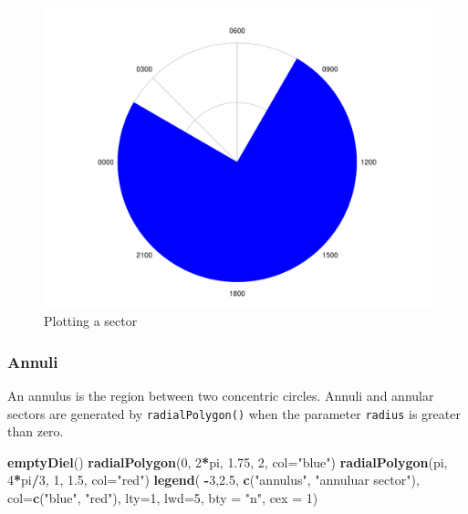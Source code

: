 \documentclass[
]{book}
\newenvironment{Shaded}{\begin{snugshade}}{\end{snugshade}}
\newcommand{\AttributeTok}[1]{\textcolor[rgb]{0.13,0.29,0.53}{#1}}
\newcommand{\DecValTok}[1]{\textcolor[rgb]{0.00,0.00,0.81}{#1}}
\newcommand{\FloatTok}[1]{\textcolor[rgb]{0.00,0.00,0.81}{#1}}
\newcommand{\FunctionTok}[1]{\textcolor[rgb]{0.13,0.29,0.53}{\textbf{#1}}}
\newcommand{\NormalTok}[1]{#1}
\newcommand{\SpecialCharTok}[1]{\textcolor[rgb]{0.81,0.36,0.00}{\textbf{#1}}}
\newcommand{\StringTok}[1]{\textcolor[rgb]{0.31,0.60,0.02}{#1}}
\begin{document}
\begin{figure}

{\centering \includegraphics[width=0.9\linewidth]{_main_files/figure-latex/radialPolygon-sector2-1} 

}

\caption{Plotting a sector}\label{fig:radialPolygon-sector2}
\end{figure}

\hypertarget{annuli}{%
\subsubsection{Annuli}\label{annuli}}

An annulus is the region between two concentric circles. Annuli and annular sectors are generated by \texttt{radialPolygon()} when the parameter \texttt{radius} is greater than zero.

\begin{Shaded}
\begin{Highlighting}[]
\FunctionTok{emptyDiel}\NormalTok{()}
\FunctionTok{radialPolygon}\NormalTok{(}\DecValTok{0}\NormalTok{, }\DecValTok{2}\SpecialCharTok{*}\NormalTok{pi, }\FloatTok{1.75}\NormalTok{, }\DecValTok{2}\NormalTok{, }\AttributeTok{col=}\StringTok{"blue"}\NormalTok{)}
\FunctionTok{radialPolygon}\NormalTok{(pi, }\DecValTok{4}\SpecialCharTok{*}\NormalTok{pi}\SpecialCharTok{/}\DecValTok{3}\NormalTok{, }\DecValTok{1}\NormalTok{, }\FloatTok{1.5}\NormalTok{, }\AttributeTok{col=}\StringTok{"red"}\NormalTok{)}
\FunctionTok{legend}\NormalTok{(}
  \SpecialCharTok{{-}}\DecValTok{3}\NormalTok{,}\FloatTok{2.5}\NormalTok{,}
  \FunctionTok{c}\NormalTok{(}\StringTok{"annulus"}\NormalTok{, }\StringTok{"annuluar sector"}\NormalTok{),}
  \AttributeTok{col=}\FunctionTok{c}\NormalTok{(}\StringTok{"blue"}\NormalTok{, }\StringTok{"red"}\NormalTok{),}
  \AttributeTok{lty=}\DecValTok{1}\NormalTok{,}
  \AttributeTok{lwd=}\DecValTok{5}\NormalTok{,}
  \AttributeTok{bty =} \StringTok{"n"}\NormalTok{,}
  \AttributeTok{cex =} \DecValTok{1}\NormalTok{)}
\end{Highlighting}
\end{Shaded}
\end{document}
